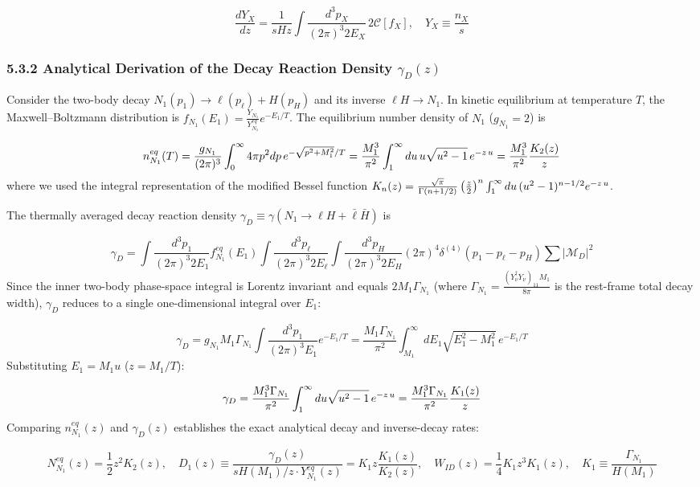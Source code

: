 \documentclass[aps,prd,onecolumn,superscriptaddress,nofootinbib,longbibliography,10pt]{revtex4-2}
\begin{document}
{{  \[ \frac{dY_X}{dz} = \frac{1}{sHz}\int\frac{d^3p_X}{(2\pi)^3 2E_X}\,2\mathcal{C}[f_X], \quad Y_X \equiv \frac{n_X}{s} \]

  
\subsubsection*{5.3.2 Analytical Derivation of the Decay Reaction Density \(\gamma_D(z)\)}

  Consider the two-body decay \(N_1(p_1) \to \ell(p_\ell) + H(p_H)\) and its inverse \(\ell H \to N_1\). In kinetic equilibrium at temperature \(T\), the Maxwell–Boltzmann distribution is \(f_{N_1}(E_1) = \frac{Y_{N_1}}{Y_{N_1}^{eq}}e^{-E_1/T}\). The equilibrium number density of \(N_1\) (\(g_{N_1} = 2\)) is


  \[ n_{N_1}^{eq}(T) = \frac{g_{N_1}}{(2\pi)^3}\int_0^\infty 4\pi p^2 dp\,e^{-\sqrt{p^2+M_1^2}/T} = \frac{M_1^3}{\pi^2}\int_1^\infty du\,u\sqrt{u^2 - 1} \, e^{{\small -z\,u}} = \frac{M_1^3}{\pi^2} \frac{K_2(z)}{z} \]
  where we used the integral representation of the modified Bessel function \(K_n(z) = \frac{\sqrt{\pi}}{\Gamma(n+1/2)}\left(\frac{z}{2}\right)^n\int_1^\infty du\,(u^2 - 1)^{n-1/2}e^{{\small -z\,u}}\).


  The thermally averaged decay reaction density \(\gamma_D \equiv \gamma(N_1 \to \ell H + \bar{\ell}\bar{H})\) is


  \[ \gamma_D = \int\frac{d^3p_1}{(2\pi)^3 2E_1}f_{N_1}^{eq}(E_1)\int\frac{d^3p_\ell}{(2\pi)^3 2E_\ell}\int\frac{d^3p_H}{(2\pi)^3 2E_H}(2\pi)^4\delta^{(4)}(p_1 - p_\ell - p_H)\sum|\mathcal{M}_D|^2 \]
  Since the inner two-body phase-space integral is Lorentz invariant and equals \(2M_1\Gamma_{N_1}\) (where \(\Gamma_{N_1} = \frac{(Y_\nu^\dagger Y_\nu)_{11}M_1}{8\pi}\) is the rest-frame total decay width), \(\gamma_D\) reduces to a single one-dimensional integral over \(E_1\):


  \[ \gamma_D = g_{N_1}M_1\Gamma_{N_1}\int\frac{d^3p_1}{(2\pi)^3 E_1}e^{-E_1/T} = \frac{M_1\Gamma_{N_1}}{\pi^2}\int_{M_1}^\infty dE_1\sqrt{E_1^2 - M_1^2}\,e^{-E_1/T} \]
  Substituting \(E_1 = M_1 u\) (\(z = M_1/T\)):


  \[ \gamma_D = \frac{M_1^3\Gamma_{N_1}}{\pi^2}\int_1^\infty du\sqrt{u^2 - 1}\,e^{{\small -z\,u}} = \frac{M_1^3\Gamma_{N_1}}{\pi^2}\frac{K_1(z)}{z} \]
  Comparing \(n_{N_1}^{eq}(z)\) and \(\gamma_D(z)\) establishes the exact analytical decay and inverse-decay rates:


  \[ N_{N_1}^{eq}(z) = \frac{1}{2}z^2 K_2(z), \quad D_1(z) \equiv \frac{\gamma_D(z)}{sH(M_1)/z\cdot Y_{N_1}^{eq}(z)} = K_1 z\frac{K_1(z)}{K_2(z)}, \quad W_{ID}(z) = \frac{1}{4}K_1 z^3 K_1(z), \quad K_1 \equiv \frac{\Gamma_{N_1}}{H(M_1)} \]

}}
\end{document}
